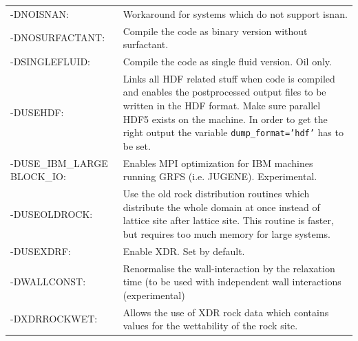 \documentclass[a4paper]{article}
\begin{document}
\begin{tabular}{p{} p{}}
-DNOISNAN: & Workaround for systems which do not support isnan. \\
-DNOSURFACTANT: & Compile the code as binary version without surfactant.\\
-DSINGLEFLUID: & Compile the code as single fluid version. Oil only.\\
-DUSEHDF: & Links all HDF related stuff when code is compiled and enables the postprocessed output files to be written in the HDF format. Make sure parallel HDF5 exists on the machine. In order to get the right output the variable {\tt dump\_format='hdf'} has to be set.\\
-DUSE\_IBM\_LARGE BLOCK\_IO: & Enables MPI optimization for IBM machines running GRFS (i.e. JUGENE). Experimental.\\
-DUSEOLDROCK: & Use the old rock distribution routines which distribute the
whole domain at once instead of lattice site after lattice site. This
routine is faster, but requires too much memory for large systems.\\
-DUSEXDRF: & Enable XDR. Set by default.\\
-DWALLCONST: & Renormalise the wall-interaction by the relaxation time (to be used with independent wall interactions (experimental) \\
-DXDRROCKWET: & Allows the use of XDR rock data which contains values for
the wettability of the rock site.
\end{tabular}
\end{document}
